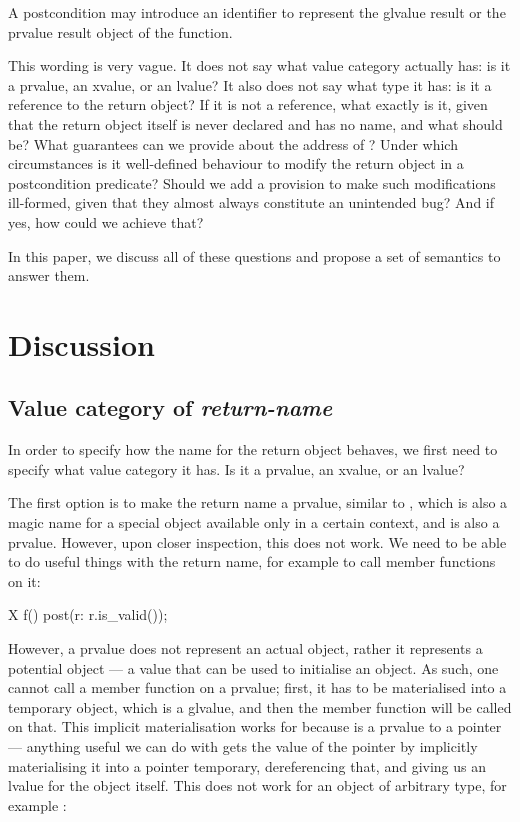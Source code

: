 \begin{adjustwidth}{0.5cm}{0.5cm}
A postcondition may introduce an identifier to represent the glvalue result or the prvalue result object of the function.
\end{adjustwidth}

This wording is very vague. It does not say what value category  actually has: is it a prvalue, an xvalue, or an lvalue? It also does not say what type it has: is it a reference to the return object? If it is not a reference, what exactly is it, given that the return object itself is never declared and has no name, and what should  be? What guarantees can we provide about the address of ? Under which circumstances is it well-defined behaviour to modify the return object in a postcondition predicate? Should we add a provision to make such modifications ill-formed, given that they almost always constitute an unintended bug? And if yes, how could we achieve that?

In this paper, we discuss all of these questions and propose a set of semantics to answer them.

\section{Discussion}

\subsection{Value category of \emph{return-name}}

In order to specify how the name for the return object behaves, we first need to specify what value category it has. Is it a prvalue, an xvalue, or an lvalue?

The first option is to make the return name a prvalue, similar to , which is also a magic name for a special object available only in a certain context, and is also a prvalue. However, upon closer inspection, this does not work. We need to be able to do useful things with the return name, for example to call member functions on it:

\begin{codeblock}
X f()
  post(r: r.is_valid());
\end{codeblock}

However, a prvalue does not represent an actual object, rather it represents a potential object --- a value that can be used to initialise an object. As such, one cannot call a member function on a prvalue; first, it has to be materialised into a temporary object, which is a glvalue, and then the member function will be called on that. This implicit materialisation works for  because  is a prvalue to a pointer --- anything useful we can do with  gets the value of the pointer by implicitly materialising it into a pointer temporary, dereferencing that, and giving us an lvalue for the object itself. This does not work for an object of arbitrary type, for example :

